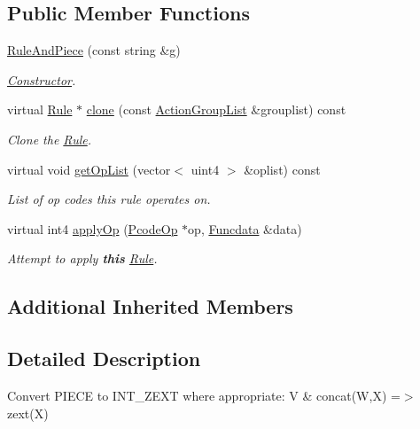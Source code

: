 \subsection*{Public Member Functions}
\begin{DoxyCompactItemize}
\item 
\mbox{\hyperlink{class_rule_and_piece_ab6c41f47671387200f987a3002f94c3f}{Rule\+And\+Piece}} (const string \&g)
\begin{DoxyCompactList}\small\item\em \mbox{\hyperlink{class_constructor}{Constructor}}. \end{DoxyCompactList}\item 
virtual \mbox{\hyperlink{class_rule}{Rule}} $\ast$ \mbox{\hyperlink{class_rule_and_piece_a7cdade8a979293fcc0cfd74888e93b12}{clone}} (const \mbox{\hyperlink{class_action_group_list}{Action\+Group\+List}} \&grouplist) const
\begin{DoxyCompactList}\small\item\em Clone the \mbox{\hyperlink{class_rule}{Rule}}. \end{DoxyCompactList}\item 
virtual void \mbox{\hyperlink{class_rule_and_piece_a51c57ede577ae45bdd82953dbc31ce3d}{get\+Op\+List}} (vector$<$ uint4 $>$ \&oplist) const
\begin{DoxyCompactList}\small\item\em List of op codes this rule operates on. \end{DoxyCompactList}\item 
virtual int4 \mbox{\hyperlink{class_rule_and_piece_a21d9a8514b5713b5899f9f84f93b0156}{apply\+Op}} (\mbox{\hyperlink{class_pcode_op}{Pcode\+Op}} $\ast$op, \mbox{\hyperlink{class_funcdata}{Funcdata}} \&data)
\begin{DoxyCompactList}\small\item\em Attempt to apply {\bfseries{this}} \mbox{\hyperlink{class_rule}{Rule}}. \end{DoxyCompactList}\end{DoxyCompactItemize}
\subsection*{Additional Inherited Members}


\subsection{Detailed Description}
Convert P\+I\+E\+CE to I\+N\+T\+\_\+\+Z\+E\+XT where appropriate\+: {\ttfamily V \& concat(\+W,\+X) =$>$ zext(\+X)} 

